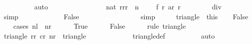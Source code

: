 \begin{isabellebody}
\ \ \ \ \ \ \ \ \isamarkupfalse%
\ auto\isanewline
\ \ \ \ \isamarkupfalse%
\isanewline
\isanewline
\ \ \ \ \isamarkupfalse%
\isanewline
\isanewline
\ \ \ \ \isamarkupfalse%
\ {}{\isacharcolon}\ {\isachardoublequoteopen}nat\ {\isacharparenleft}{\isacharparenleft}{\isasymSum}r{\isacharprime}{\isasymleftarrow}{\isacharbrackleft}r{}{\isachardot}{\isachardot}{\isacharless}{\isacharparenleft}r{}\ {\isacharplus}\ n\ {\isacharminus}\ {}{\isacharparenright}\ {\isacharplus}\ {}{\isacharbrackright}{\isachardot}\ f\ r{\isacharprime}\ {\isacharparenleft}ar\ r{\isacharprime}{\isacharparenright}{\isacharparenright}{\isacharparenright}\ {\isasymge}\ {}{}{}{}\ {\isacharasterisk}\ {\isacharparenleft}{}{\isacharasterisk}{}{}{}{}\ {\isacharplus}\ {}{}{}{}\ {\isacharplus}\ {}{\isacharparenright}\ div\ {}{\isachardoublequoteclose}\isanewline
\ \ \ \ \ \ \isamarkupfalse%
\ simp\isanewline
\ \ \ \ \ \ \isanewline
\isanewline
\ \ \ \ \isamarkupfalse%
\ False\isanewline
\ \ \ \ \ \ \isamarkupfalse%
\ {}\ {}\isanewline
\ \ \ \ \ \ \isamarkupfalse%
\ simp\isanewline
\ \ \isacommand{{\isacharbraceright}}\isamarkupfalse%
\ \isamarkupfalse%
\ triangle\ {\isacharequal}\ this\isanewline
\isanewline
\ \ \isamarkupfalse%
\ False\isanewline
\ \ \isamarkupfalse%
\ {\isacharparenleft}cases\ {\isachardoublequoteopen}{\isacharquery}nl\ {\isasymle}\ {\isacharquery}nr{\isachardoublequoteclose}{\isacharparenright}\isanewline
\ \ \ \ \isamarkupfalse%
\ True\isanewline
\ \ \ \ \isamarkupfalse%
\ False\isanewline
\ \ \ \ \isamarkupfalse%
\ {\isacharparenleft}rule\ triangle{\isacharparenright}\isanewline
\ \ \ \ \ \ \isamarkupfalse%
\ {\isachardoublequoteopen}triangle\ {\isacharquery}r{}r\ {\isacharquery}c{}r\ {\isacharquery}nr\ {\isasymsubseteq}\ triangle\ {}\ {}\ {}{}{}{}{\isachardoublequoteclose}\isanewline
\ \ \ \ \ \ \ \ \isamarkupfalse%
\ triangle{\isacharunderscore}def\isanewline
\ \ \ \ \ \ \ \ \isamarkupfalse%
\ auto\isanewline
\ \ \ \ \isamarkupfalse%

\end{isabellebody}
